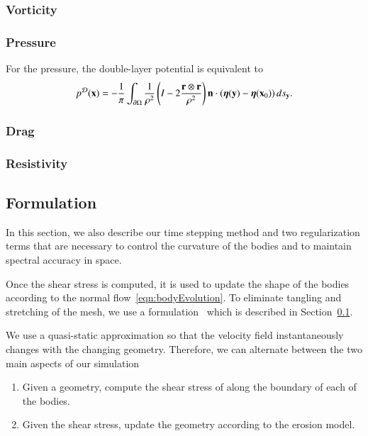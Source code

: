 \documentclass[preprint, 10pt]{elsarticle}
\begin{document}
\subsubsection{Vorticity}


\subsubsection{Pressure}
For the pressure, the double-layer potential is equivalent to
\begin{align*}
  p^{\mathcal{D}}({\mathbf{x}}) = -\frac{1}{\pi}\int_{{\partial}\Omega} \frac{1}{\rho^2}
    \left(I - 2 \frac{{\mathbf{r}} \otimes {\mathbf{r}}}{\rho^2}\right) 
    {\mathbf{n}} \cdot ({\boldsymbol\eta}({\mathbf{y}}) - {\boldsymbol\eta}({\mathbf{x}}_0)) \,ds_{\mathbf{y}}.
\end{align*}


\subsubsection{Drag}



\subsubsection{Resistivity}



\subsection{{\thL} Formulation} 
\label{sec:thetaL}

In this section, we also describe our time stepping method and two
regularization terms that are necessary to control the curvature of the
bodies and to maintain spectral accuracy in space.


Once the shear stress is computed, it is used to update the shape of the
bodies according to the normal flow~\eqref{eqn:bodyEvolution}.  To
eliminate tangling and stretching of the mesh, we use a {\thL}
formulation~\cite{hou-low-she1994} which is described in
Section~\ref{sec:thetaL}.




We use a quasi-static approximation so that the velocity field
instantaneously changes with the changing geometry.  Therefore, we can
alternate between the two main aspects of our simulation
\begin{enumerate}
  \item Given a geometry, compute the shear stress of along the boundary
    of each of the bodies.
  \item Given the shear stress, update the geometry according to the
    erosion model.
\end{enumerate}
\end{document}
